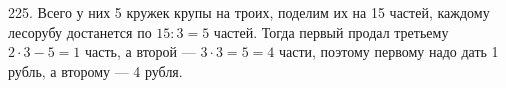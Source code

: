 225. Всего у них 5 кружек крупы на троих, поделим их на 15 частей, каждому лесорубу достанется по $15:3=5$ частей. Тогда первый продал третьему $2\cdot3-5=1$ часть, а второй --- $3\cdot3=5=4$ части, поэтому первому надо дать 1 рубль, а второму --- 4 рубля.\\
